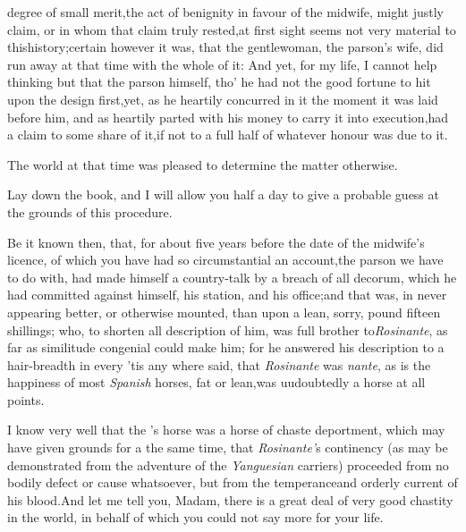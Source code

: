 \documentclass{article}
\begin{document}
\vskip-6pt

 degree of small merit,\break the
act of benignity in favour of the midwife, might justly claim, or in
whom that claim truly rested,\tsk at first sight seems not very
material to this\break history;\tsh certain however it was, that
the gentlewoman, the parson’s wife, did run away at that time
with the whole of it: And yet, for my life, I cannot help thinking
but that the parson himself, tho’ he had not the good fortune to
hit upon the design first,\tsk yet, as he heartily concurred in
it the moment it was laid before him, and as heartily parted with\break
his money to carry it into execution,\break had a claim to some share of
it,\tsk if not to a full half of whatever honour was due to
it.

The world at that time was pleased to determine the matter
otherwise.

Lay down the book, and I will allow you half a day to give a
probable guess at the grounds of this procedure.

Be it known then, that, for about five years before the date of
the midwife’s licence, of which you have had so
circumstantial an account,\tsk the parson we have to do with, had
made himself a country-talk by a breach of all decorum, which he
had committed against himself, his station, and his
office;\tsk and that was, in never appearing better, or otherwise
mounted, than upon a lean, sorry,\break
{}
pound fifteen shillings; who, to shorten all description of
him, was full brother to\break \textit{Rosinante}, as far as similitude
congenial could make him; for he answered his\break
description to a hair-breadth in every\break
{}
’tis any where said, that \textit{Rosinante} was 
\textit{nante}, as is the happiness of most
\textit{Spanish} horses, fat or lean,\tsk was uu\sic doubtedly a horse
at all points.

I know very well that the ’s\break
horse was a horse of chaste deportment, which may
have given grounds for a 
the same time, that \textit{Rosinante’}s continen\-cy (as may
be demonstrated from the adventure of the \textit{Yanguesian}
carriers) proceeded from no bodily defect or cause whatsoever, but
from the temperance\break and orderly current of his blood.\tsk And\break
let me tell you, Madam, there is a great\break
deal of very good chastity in the world,\break
in behalf of which you could not say\break
more for your life.
\end{document}
